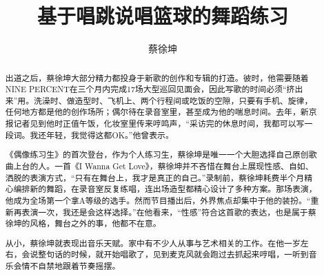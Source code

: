 \documentclass[pdf]{oucthesis}
\title{基于唱跳说唱篮球的舞蹈练习}
\author{蔡徐坤}
\begin{document}
\makeprepage

\begin{abstract}

出道之后，蔡徐坤大部分精力都投身于新歌的创作和专辑的打造。彼时，他需要随着NINE PERCENT在三个月内完成17场大型巡回见面会，因此写歌的时间必须“挤出来”用。洗澡时、做造型时、飞机上、两个行程间或吃饭的空隙，只要有手机、旋律，任何地方都是他的创作场所；偶尔待在录音室里，甚至成为他的喘息时间。去年，新京报记者见到他时正值午饭，化妆室里传来哼鸣声，“采访完的休息时间，我都可以写一段词。我还年轻，我觉得这都OK。”他曾表示。

《偶像练习生》的首次登台，作为个人练习生，蔡徐坤是唯一一个大胆选择自己原创歌曲上台的人。一首《I Wanna Get Love》，蔡徐坤并不吝惜在舞台上展现性感、自如、洒脱的表演方式，“只有在舞台上，我才是真正的自己。”录制前，蔡徐坤耗费半个月精心编排新的舞蹈，在录音室反复练唱，连出场造型都精心设计了多种方案。那场表演，他成为全场第一个拿A等级的选手。然而节目播出后，外界焦点却集中于他的装扮。“重新再表演一次，我还是会这样选择。”在他看来，“性感”符合这首歌的表达，也是属于蔡徐坤的风格，舞台之外的事，他都不在意。

从小，蔡徐坤就表现出音乐天赋。家中有不少人从事与艺术相关的工作。在他一岁左右，会说整句话的时候，就开始唱歌了，见到麦克风就会跑过去抓起来哼唱，一听到音乐会情不自禁地跟着节奏摇摆。




\end{abstract}
\end{document}
